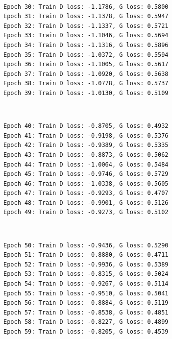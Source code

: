 \documentclass[11pt]{article}
\begin{document}
    \begin{center}
    \end{center}
    { \hspace*{\fill} \\}
    
    \begin{Verbatim}[commandchars=\\\{\}]
Epoch 30: Train D loss: -1.1786, G loss: 0.5800
Epoch 31: Train D loss: -1.1378, G loss: 0.5947
Epoch 32: Train D loss: -1.1337, G loss: 0.5721
Epoch 33: Train D loss: -1.1046, G loss: 0.5694
Epoch 34: Train D loss: -1.1316, G loss: 0.5896
Epoch 35: Train D loss: -1.0372, G loss: 0.5594
Epoch 36: Train D loss: -1.1005, G loss: 0.5617
Epoch 37: Train D loss: -1.0920, G loss: 0.5638
Epoch 38: Train D loss: -1.0778, G loss: 0.5737
Epoch 39: Train D loss: -1.0130, G loss: 0.5109

    \end{Verbatim}

    \begin{center}
    \end{center}
    { \hspace*{\fill} \\}
    
    \begin{Verbatim}[commandchars=\\\{\}]
Epoch 40: Train D loss: -0.8705, G loss: 0.4932
Epoch 41: Train D loss: -0.9198, G loss: 0.5376
Epoch 42: Train D loss: -0.9389, G loss: 0.5335
Epoch 43: Train D loss: -0.8873, G loss: 0.5062
Epoch 44: Train D loss: -1.0064, G loss: 0.5484
Epoch 45: Train D loss: -0.9746, G loss: 0.5729
Epoch 46: Train D loss: -1.0338, G loss: 0.5605
Epoch 47: Train D loss: -0.9293, G loss: 0.4707
Epoch 48: Train D loss: -0.9901, G loss: 0.5126
Epoch 49: Train D loss: -0.9273, G loss: 0.5102

    \end{Verbatim}

    \begin{center}
    \end{center}
    { \hspace*{\fill} \\}
    
    \begin{Verbatim}[commandchars=\\\{\}]
Epoch 50: Train D loss: -0.9436, G loss: 0.5290
Epoch 51: Train D loss: -0.8880, G loss: 0.4711
Epoch 52: Train D loss: -0.9936, G loss: 0.5389
Epoch 53: Train D loss: -0.8315, G loss: 0.5024
Epoch 54: Train D loss: -0.9267, G loss: 0.5114
Epoch 55: Train D loss: -0.9510, G loss: 0.5041
Epoch 56: Train D loss: -0.8884, G loss: 0.5119
Epoch 57: Train D loss: -0.8538, G loss: 0.4851
Epoch 58: Train D loss: -0.8227, G loss: 0.4899
Epoch 59: Train D loss: -0.8205, G loss: 0.4539

    \end{Verbatim}
\end{document}
